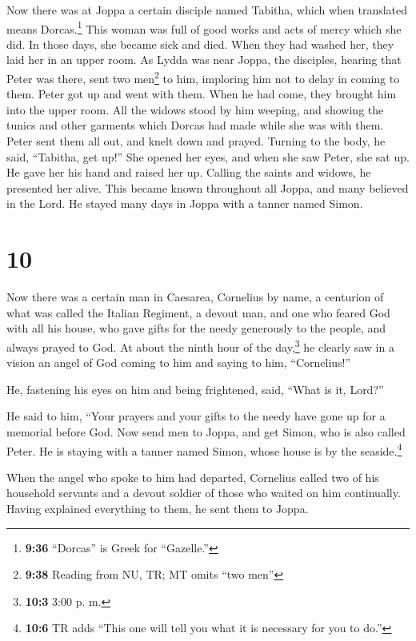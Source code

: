 Now there was at Joppa a certain disciple named Tabitha,
which when translated means Dorcas.\footnote{\textbf{9:36} ``Dorcas'' is
  Greek for ``Gazelle.''} This woman was full of good works and acts of
mercy which she did.  In those days, she became sick and
died. When they had washed her, they laid her in an upper room.
 As Lydda was near Joppa, the disciples, hearing that
Peter was there, sent two men\footnote{\textbf{9:38} Reading from NU,
  TR; MT omits ``two men''} to him, imploring him not to delay in coming
to them.  Peter got up and went with them. When he had
come, they brought him into the upper room. All the widows stood by him
weeping, and showing the tunics and other garments which Dorcas had made
while she was with them.  Peter sent them all out, and
knelt down and prayed. Turning to the body, he said, ``Tabitha, get
up!'' She opened her eyes, and when she saw Peter, she sat up.
 He gave her his hand and raised her up. Calling the
saints and widows, he presented her alive.  This became
known throughout all Joppa, and many believed in the Lord.
 He stayed many days in Joppa with a tanner named Simon.

\hypertarget{section-9}{%
\section{10}\label{section-9}}

 Now there was a certain man in Caesarea, Cornelius by
name, a centurion of what was called the Italian Regiment,
 a devout man, and one who feared God with all his house,
who gave gifts for the needy generously to the people, and always prayed
to God.  At about the ninth hour of the day,\footnote{\textbf{10:3}
  3:00 p. m.} he clearly saw in a vision an angel of God coming to him
and saying to him, ``Cornelius!''

 He, fastening his eyes on him and being frightened, said,
``What is it, Lord?''

He said to him, ``Your prayers and your gifts to the needy have gone up
for a memorial before God.  Now send men to Joppa, and get
Simon, who is also called Peter.  He is staying with a
tanner named Simon, whose house is by the seaside.\footnote{\textbf{10:6}
  TR adds ``This one will tell you what it is necessary for you to do.''}

 When the angel who spoke to him had departed, Cornelius
called two of his household servants and a devout soldier of those who
waited on him continually.  Having explained everything to
them, he sent them to Joppa.

